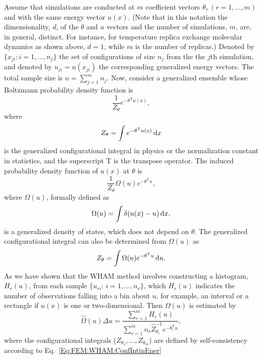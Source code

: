 Assume that simulations are conducted at $m$ coefficient vectors $\theta_r\, (r=1,\dots,m)$ and with the same energy vector $u(x)$. (Note that in this notation the dimensionality, $d$, of the $\theta$ and $u$ vectors and the number of simulations, $m$, are, in general, distinct. For instance, for temperature replica exchange molecular dynamics as shown above, $d=1$, while $m$ is the number of replicas.) Denoted by $\{x_{ji}: i=1,\dots,n_j\}$ the set of configurations of size $n_j$ from the the $j$th simulation, and denoted by $u_{ji}=u(x_{ji})$ the corresponding generalized energy vectors. The total sample size is $n=\sum_{j=1}^m n_j$. Now, consider a generalized ensemble whose Boltzmann probability density function is
\begin{equation}
\frac{1}{Z_\theta}e^{-\theta^\mathrm{T}u(x)},
\end{equation}
where
\begin{equation}
Z_\theta=\int e^{-\theta^\mathrm{T}u(x)}\mathop{}\!\mathrm{d}{x}
\end{equation}
is the generalized configurational integral in physics or the normalization constant in statistics, and the superscript $\mathrm{T}$ is the transpose operator. The induced probability density function of $u(x)$ at $\theta$ is
\begin{equation}
    \frac{1}{Z_\theta}\Omega(u)e^{-\theta^\mathrm{T}u},
\end{equation}
where $\Omega(u)$, formally defined as
\begin{equation}
    \Omega(u)=\int \delta(u(x)-u)\mathop{}\!\mathrm{d} x,
\end{equation}
is a generalized density of states, which does not depend on $\theta$. The generalized configurational integral can also be determined from $\Omega(u)$ as
\begin{equation}
    Z_\theta=\int \Omega(u)e^{-\theta^\mathrm{T}u}\mathop{}\!\mathrm{d} u.
\end{equation}
As we have shown that the WHAM method involves constructing a histogram, $H_r(u)$, from each sample $\{u_{ri}:\, i=1,\dots,n_r\}$, which $H_r(u)$ indicates the number of observations falling into a bin about $u$, for example, an interval or a rectangle if $u(x)$ is one or two-dimensional. Then $\Omega(u)$ is estimated by
\begin{equation}
    \hat{\Omega}(u)\Delta u=\frac{\sum_{r=1}^m H_r(u)}{\sum_{r=1}^m n_r\hat{Z}_{\theta_r}^{-1}e^{-\theta_r^\mathrm{T}u}},
    \label{Eq:FEM:WHAM:ConfIntinEner}
\end{equation}
where the configurational integrals ($Z_{\theta_1},\dots,Z_{\theta_m}$) are defined by self-consistency according to Eq.~\ref{Eq:FEM:WHAM:ConfIntinEner}
